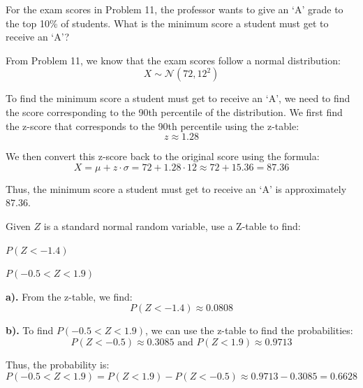 \documentclass[a4paper, 10pt]{article}
\begin{document}
\begin{problem}
For the exam scores in Problem 11, the professor wants to give an `A' grade to the top 10\% of students.
What is the minimum score a student must get to receive an `A'?
\end{problem}

\begin{solution}
	From Problem 11, we know that the exam scores follow a normal distribution: \[ X \sim \mathcal{N}(72, 12^2) \]

	To find the minimum score a student must get to receive an `A',
	we need to find the score corresponding to the 90th percentile of the distribution.
	We first find the z-score that corresponds to the 90th percentile using the z-table: \[ z \approx 1.28 \]

	We then convert this z-score back to the original score using the formula:
	\[ X = \mu + z \cdot \sigma = 72 + 1.28 \cdot 12 \approx 72 + 15.36 = 87.36 \]

	Thus, the minimum score a student must get to receive an `A' is approximately \( \boxed{87.36} \).
\end{solution}

\begin{problem}
Given \( Z \) is a standard normal random variable, use a Z-table to find:
\begin{subproblems_alpha}
	\item \( P(Z < -1.4) \)
	\item \( P(-0.5 < Z < 1.9) \)
\end{subproblems_alpha}
\end{problem}

\begin{solution}
	\textbf{a).} From the z-table, we find:
	\[ P(Z < -1.4) \approx \boxed{0.0808} \]

	\textbf{b).} To find \( P(-0.5 < Z < 1.9) \), we can use the z-table to find the probabilities:
	\[ P(Z < -0.5) \approx 0.3085 \text{ and } P(Z < 1.9) \approx 0.9713 \]

	Thus, the probability is:
	\[ P(-0.5 < Z < 1.9) = P(Z < 1.9) - P(Z < -0.5) \approx 0.9713 - 0.3085 = \boxed{0.6628} \]
\end{solution}
\end{document}
